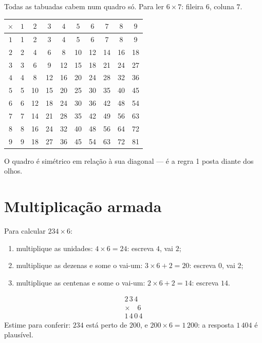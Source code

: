 \begin{example}\label{ex:g3:mult:table}
Todas as tabuadas cabem num quadro só. Para ler $6 \times 7$:
fileira $6$, coluna $7$.
\begin{center}
\renewcommand{\arraystretch}{1.15}
\begin{tabular}{c|ccccccccc}
$\times$ & $1$ & $2$ & $3$ & $4$ & $5$ & $6$ & $7$ & $8$ & $9$ \\
\hline
$1$ & 1 & 2 & 3 & 4 & 5 & 6 & 7 & 8 & 9 \\
$2$ & 2 & 4 & 6 & 8 & 10 & 12 & 14 & 16 & 18 \\
$3$ & 3 & 6 & 9 & 12 & 15 & 18 & 21 & 24 & 27 \\
$4$ & 4 & 8 & 12 & 16 & 20 & 24 & 28 & 32 & 36 \\
$5$ & 5 & 10 & 15 & 20 & 25 & 30 & 35 & 40 & 45 \\
$6$ & 6 & 12 & 18 & 24 & 30 & 36 & 42 & 48 & 54 \\
$7$ & 7 & 14 & 21 & 28 & 35 & 42 & 49 & 56 & 63 \\
$8$ & 8 & 16 & 24 & 32 & 40 & 48 & 56 & 64 & 72 \\
$9$ & 9 & 18 & 27 & 36 & 45 & 54 & 63 & 72 & 81 \\
\end{tabular}
\end{center}
O quadro é simétrico em relação à sua diagonal --- é a regra 1 posta
diante dos olhos.
\end{example}

\section{Multiplicação armada}

\begin{method}\label{met:g3:mult:column}
Para calcular $234 \times 6$:
\begin{enumerate}
  \item multiplique as unidades: $4 \times 6 = 24$: escreva $4$, vai
        $2$;
  \item multiplique as dezenas e some o vai-um:
        $3 \times 6 + 2 = 20$: escreva $0$, vai $2$;
  \item multiplique as centenas e some o vai-um:
        $2 \times 6 + 2 = 14$: escreva $14$.
\end{enumerate}
\[
\begin{array}{r}
2\,3\,4 \\
\times \quad 6 \\
\hline
1\,4\,0\,4
\end{array}
\]
Estime para conferir: $234$ está perto de $200$, e
$200 \times 6 = 1\,200$: a resposta $1\,404$ é plausível.
\end{method}

